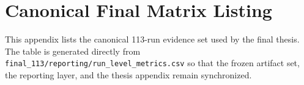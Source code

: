 \chapter{Canonical Final Matrix Listing}

This appendix lists the canonical 113-run evidence set used by the final thesis. The table is generated directly from \texttt{final\_113/reporting/run\_level\_metrics.csv} so that the frozen artifact set, the reporting layer, and the thesis appendix remain synchronized.


